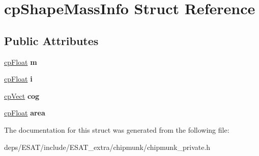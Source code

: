 \hypertarget{structcp_shape_mass_info}{}\section{cp\+Shape\+Mass\+Info Struct Reference}
\label{structcp_shape_mass_info}
\subsection*{Public Attributes}
\begin{DoxyCompactItemize}
\item 
\mbox{\label{structcp_shape_mass_info_a58bfe9fbe8e65d4c6d85e85239ed2949}} 
\mbox{\hyperlink{group__basic_types_gac1ed65573e035bf892505768c852d8d3}{cp\+Float}} {\bfseries m}
\item 
\mbox{\label{structcp_shape_mass_info_aeafbe883d745085473803f94fcbbc4a6}} 
\mbox{\hyperlink{group__basic_types_gac1ed65573e035bf892505768c852d8d3}{cp\+Float}} {\bfseries i}
\item 
\mbox{\label{structcp_shape_mass_info_ae030b38dca3b580d186f704b588dfb1a}} 
\mbox{\hyperlink{structcp_vect}{cp\+Vect}} {\bfseries cog}
\item 
\mbox{\label{structcp_shape_mass_info_a9ca38a5d2d0a13fb72b64a18c8f9de01}} 
\mbox{\hyperlink{group__basic_types_gac1ed65573e035bf892505768c852d8d3}{cp\+Float}} {\bfseries area}
\end{DoxyCompactItemize}


The documentation for this struct was generated from the following file\+:\begin{DoxyCompactItemize}
\item 
deps/\+E\+S\+A\+T/include/\+E\+S\+A\+T\+\_\+extra/chipmunk/chipmunk\+\_\+private.\+h\end{DoxyCompactItemize}
